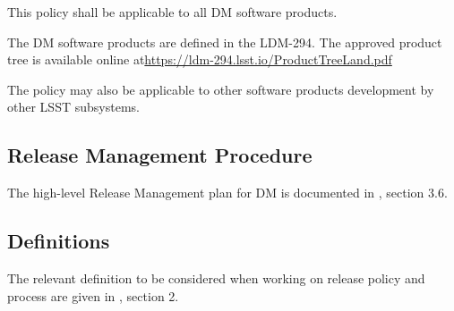 This policy shall be applicable to all \gls{DM} software products.

The \gls{DM} software products are defined in the LDM-294. 
The approved product tree is available online at\url{https://ldm-294.lsst.io/ProductTreeLand.pdf}

The policy may also be applicable to other software products development by other \gls{LSST} subsystems.


\subsection{Release Management Procedure} \label{sec:rmproc}

The high-level Release Management plan for \gls{DM} is documented in , section 3.6. 


\subsection{Definitions} \label{sec:defs}

The relevant definition to be considered when working on release policy and process are given in , section 2.
